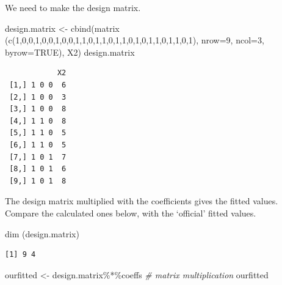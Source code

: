 \documentclass[
  oneside]{krantz}
\newenvironment{Shaded}{\begin{snugshade}}{\end{snugshade}}
\newcommand{\AttributeTok}[1]{\textcolor[rgb]{0.77,0.63,0.00}{#1}}
\newcommand{\CommentTok}[1]{\textcolor[rgb]{0.56,0.35,0.01}{\textit{#1}}}
\newcommand{\ConstantTok}[1]{\textcolor[rgb]{0.00,0.00,0.00}{#1}}
\newcommand{\DecValTok}[1]{\textcolor[rgb]{0.00,0.00,0.81}{#1}}
\newcommand{\FunctionTok}[1]{\textcolor[rgb]{0.00,0.00,0.00}{#1}}
\newcommand{\NormalTok}[1]{#1}
\newcommand{\OtherTok}[1]{\textcolor[rgb]{0.56,0.35,0.01}{#1}}
\newcommand{\SpecialCharTok}[1]{\textcolor[rgb]{0.00,0.00,0.00}{#1}}
\begin{document}
We need to make the design matrix.

\begin{Shaded}
\begin{Highlighting}[]
\NormalTok{design.matrix }\OtherTok{\textless{}{-}} \FunctionTok{cbind}\NormalTok{(}\FunctionTok{matrix}\NormalTok{ (}\FunctionTok{c}\NormalTok{(}\DecValTok{1}\NormalTok{,}\DecValTok{0}\NormalTok{,}\DecValTok{0}\NormalTok{,}\DecValTok{1}\NormalTok{,}\DecValTok{0}\NormalTok{,}\DecValTok{0}\NormalTok{,}\DecValTok{1}\NormalTok{,}\DecValTok{0}\NormalTok{,}\DecValTok{0}\NormalTok{,}\DecValTok{1}\NormalTok{,}\DecValTok{1}\NormalTok{,}\DecValTok{0}\NormalTok{,}\DecValTok{1}\NormalTok{,}\DecValTok{1}\NormalTok{,}\DecValTok{0}\NormalTok{,}\DecValTok{1}\NormalTok{,}\DecValTok{1}\NormalTok{,}\DecValTok{0}\NormalTok{,}\DecValTok{1}\NormalTok{,}\DecValTok{0}\NormalTok{,}\DecValTok{1}\NormalTok{,}\DecValTok{1}\NormalTok{,}\DecValTok{0}\NormalTok{,}\DecValTok{1}\NormalTok{,}\DecValTok{1}\NormalTok{,}\DecValTok{0}\NormalTok{,}\DecValTok{1}\NormalTok{),}
                               \AttributeTok{nrow=}\DecValTok{9}\NormalTok{, }\AttributeTok{ncol=}\DecValTok{3}\NormalTok{, }\AttributeTok{byrow=}\ConstantTok{TRUE}\NormalTok{), X2)}
\NormalTok{design.matrix}
\end{Highlighting}
\end{Shaded}

\begin{verbatim}
            X2
 [1,] 1 0 0  6
 [2,] 1 0 0  3
 [3,] 1 0 0  8
 [4,] 1 1 0  8
 [5,] 1 1 0  5
 [6,] 1 1 0  5
 [7,] 1 0 1  7
 [8,] 1 0 1  6
 [9,] 1 0 1  8
\end{verbatim}

The design matrix multiplied with the coefficients gives the fitted values. Compare the calculated ones below, with the `official' fitted values.

\begin{Shaded}
\begin{Highlighting}[]
\FunctionTok{dim}\NormalTok{ (design.matrix)}
\end{Highlighting}
\end{Shaded}

\begin{verbatim}
[1] 9 4
\end{verbatim}

\begin{Shaded}
\begin{Highlighting}[]
\NormalTok{ourfitted }\OtherTok{\textless{}{-}}\NormalTok{ design.matrix}\SpecialCharTok{\%*\%}\NormalTok{coeffs }\CommentTok{\# matrix multiplication}
\NormalTok{ourfitted}
\end{Highlighting}
\end{Shaded}
\end{document}
